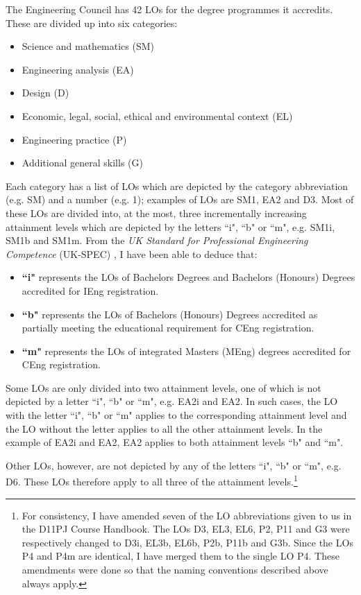 The Engineering Council has 42 LOs for the degree programmes it accredits.
These are divided up into six categories:
\begin{itemize}
    \item Science and mathematics (SM)
    \item Engineering analysis (EA)
    \item Design (D)
    \item Economic, legal, social, ethical and environmental context (EL)
    \item Engineering practice (P)
    \item Additional general skills (G)
\end{itemize}
Each category has a list of LOs which are depicted by the category abbreviation (e.g. SM) and a number (e.g. 1); examples of LOs are SM1, EA2 and D3.
Most of these LOs are divided into, at the most, three incrementally increasing attainment levels which are depicted by the letters ``i", ``b" or ``m", e.g. SM1i, SM1b and SM1m.
From the \textit{UK Standard for Professional Engineering Competence} (UK-SPEC) \citep{EngineeringCouncil2014}, 
I have been able to deduce that:
\begin{itemize}
    \item \textbf{``i"} represents the LOs of Bachelors Degrees and Bachelors (Honours) Degrees accredited for IEng registration.
    \item \textbf{``b"} represents the LOs of Bachelors (Honours) Degrees accredited as partially meeting the educational requirement for CEng registration.
    \item \textbf{``m"} represents the LOs of integrated Masters (MEng) degrees accredited for CEng registration.
\end{itemize}

Some LOs are only divided into two attainment levels, one of which is not depicted by a letter ``i", ``b" or ``m", e.g. EA2i and EA2.
In such cases, the LO with the letter ``i", ``b" or ``m" applies to the corresponding attainment level and the LO without the letter applies to all the other attainment levels.
In the example of EA2i and EA2, EA2 applies to both attainment levels ``b" and ``m".

Other LOs, however, are not depicted by any of the letters ``i", ``b" or ``m", e.g. D6.
These LOs therefore apply to all three of the attainment levels.\footnote{
For consistency, I have amended seven of the LO abbreviations given to us in the D11PJ Course Handbook.
The LOs D3, EL3, EL6, P2, P11 and G3 were respectively changed to D3i, EL3b, EL6b, P2b, P11b and G3b.
Since the LOs P4 and P4m are identical, I have merged them to the single LO P4.
These amendments were done so that the naming conventions described above always apply.}


